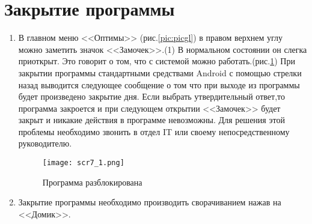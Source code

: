 \section{Закрытие программы}
\begin{enumerate}[\thesection .1]
	\item В главном меню <<Оптимы>> (рис.\ref{pic:picgl}) в правом верхнем углу можно заметить значок <<Замочек>>.(1) В нормальном состоянии он слегка приоткрыт. Это говорит о том, что с системой можно работать.(рис.\ref{pic:pic7_1})
    При закрытии программы стандартными средствами Android с помощью стрелки назад выводится следующее сообщение о том что при выходе из программы будет произведено закрытие дня. Если выбрать утвердительный ответ,то программа закроется и при следующем открытии <<Замочек>> будет закрыт и никакие действия в программе невозможны. Для решения этой проблемы необходимо звонить в отдел IT или своему непосредственному руководителю.
    \begin{figure}[H]
    	\texttt{[image: scr7\_1.png]} 
    	\caption{Программа разблокирована}\label{pic:pic7_1}
    \end{figure}
    \item Закрытие программы необходимо производить сворачиванием нажав на <<Домик>>.	
\end{enumerate}